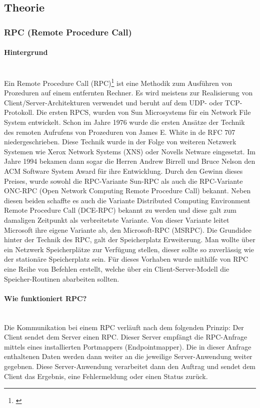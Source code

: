 \subsection{Theorie}

\subsubsection{RPC (Remote Procedure Call)}
\paragraph{Hintergrund} \mbox{} \vspace{2mm} \\ 
Ein Remote Procedure Call (RPC)\footnote{\cite{rpc-datacenter}} ist eine Methodik zum Ausführen von Prozeduren auf einem entfernten Rechner. Es wird meistens zur Realisierung von Client/Server-Architekturen verwendet und beruht auf dem UDP- oder TCP-Protokoll. Die ersten RPCS, wurden von Sun Microsystems für ein Network File System entwickelt. Schon im Jahre 1976 wurde die ersten Ansätze der Technik des remoten Aufrufens von Prozeduren von  James E. White in de RFC 707 niedergeschrieben. Diese Technik wurde in der Folge von weiteren Netzwerk Systemen wie Xerox Network Systems (XNS) oder Novells Netware eingesetzt. Im Jahre 1994 bekamen dann sogar die Herren Andrew Birrell und Bruce Nelson den ACM Software System Award für ihre Entwicklung. Durch den Gewinn dieses Preises, wurde sowohl die RPC-Variante Sun-RPC als auch die RPC-Variante ONC-RPC (Open Network Computing Remote Procedure Call) bekannt. Neben diesen beiden schaffte es auch die Variante Distributed Computing Environment Remote Procedure Call (DCE-RPC) bekannt zu werden und diese galt zum damaligen Zeitpunkt als verbreitetste Variante. Von dieser Variante leitet Microsoft ihre eigene Variante ab, den Microsoft-RPC (MSRPC). Die Grundidee hinter der Technik des RPC, galt der Speicherplatz Erweiterung. Man wollte über ein Netzwerk Speicherplätze zur Verfügung stellen, dieser sollte so zuverlässig wie der stationäre Speicherplatz sein. Für dieses Vorhaben wurde mithilfe von RPC eine Reihe von Befehlen erstellt, welche über ein Client-Server-Modell die Speicher-Routinen abarbeiten sollten.

\paragraph{Wie funktioniert RPC?} \mbox{} \vspace{2mm} \\
Die Kommunikation bei einem RPC verläuft nach dem folgenden Prinzip: Der Client sendet dem Server einen RPC. Dieser Server empfängt die RPC-Anfrage mittels eines installierten Portmappers (Endpointmapper). Die in dieser Anfrage enthaltenen Daten werden dann weiter an die jeweilige Server-Anwendung weiter gegebnen. Diese Server-Anwendung verarbeitet dann den Auftrag und sendet dem Client das Ergebnis, eine Fehlermeldung oder einen Status zurück.

